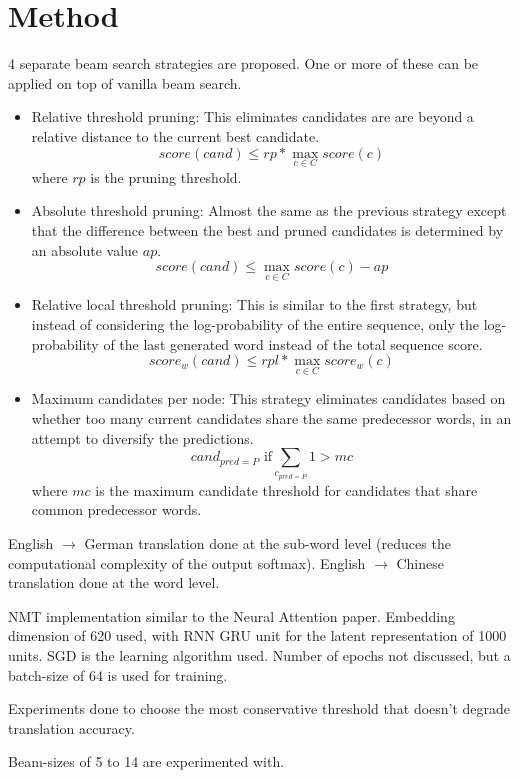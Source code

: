 \documentclass[12pt]{article}
\begin{document}
\section{Method}
  4 separate beam search strategies are proposed. One or more of these can be applied on top of vanilla beam search.
  \begin{itemize}
    \item Relative threshold pruning: This eliminates candidates are are beyond a relative distance to the current best candidate. $$score(cand) \leq rp * \max_{c \in C} {score(c)}$$ where $rp$ is the pruning threshold.
    \item Absolute threshold pruning: Almost the same as the previous strategy except that the difference between the best and pruned candidates is determined by an absolute value $ap$. $$score(cand) \leq \max_{c \in C} {score(c)} - ap$$
    \item Relative local threshold pruning: This is similar to the first strategy, but instead of considering the log-probability of the entire sequence, only the log-probability of the last generated word instead of the total sequence score. $$score_w(cand) \leq rpl * \max_{c \in C} {score_w(c)}$$
    \item Maximum candidates per node: This strategy eliminates candidates based on whether too many current candidates share the same predecessor words, in an attempt to diversify the predictions. $$cand_{pred = P} \text{ if} \sum_{c_{pred = P}} 1 > mc$$ where $mc$ is the maximum candidate threshold for candidates that share common predecessor words.
  \end{itemize}

  English $\rightarrow$ German translation done at the sub-word level (reduces the computational complexity of the output softmax). English $\rightarrow$ Chinese translation done at the word level.
  
  NMT implementation similar to the Neural Attention \cite{bahdanau2014neural} paper. Embedding dimension of 620 used, with RNN GRU unit for the latent representation of 1000 units. SGD is the learning algorithm used. Number of epochs not discussed, but a batch-size of 64 is used for training.
  
  Experiments done to choose the most conservative threshold that doesn't degrade translation accuracy. 
  
  Beam-sizes of 5 to 14 are experimented with.
\end{document}
